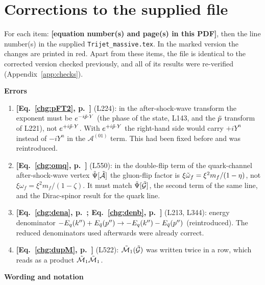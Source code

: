 \documentclass[9pt]{article}
\numberwithin{equation}{section}
\begin{document}
\appendix
\section{Corrections to the supplied file}\label{app:corr}
For each item: \textbf{[equation number(s) and page(s) in this PDF]}, then the line number(s) in the supplied \texttt{Trijet\_massive.tex}. In the marked version the changes are printed in {\color{red}red}. Apart from these items, the file is identical to the corrected version checked previously, and all of its results were re-verified (Appendix~\ref{app:checks}).

\noindent\textbf{Errors}
\begin{enumerate}
    \item \textbf{[Eq.~\eqref{chg:pFT2}, p.~\pageref{chg:pFT2}]} (L224): in the after-shock-wave transform the exponent must be $e^{-i\Tilde{p}\cdot Y}$ (the phase of the state, L143, and the $\Tilde{p}$ transform of L221), not $e^{+i\Tilde{p}\cdot Y}$. With $e^{+i\Tilde{p}\cdot Y}$ the right-hand side would carry $+iY^{n}$ instead of $-iY^{n}$ in the $\mathcal{A}^{(01)}$ term. This had been fixed before and was reintroduced.
    \item \textbf{[Eq.~\eqref{chg:omq}, p.~\pageref{chg:omq}]} (L550): in the double-flip term of the quark-channel after-shock-wave vertex $\Tilde{\Psi}[\Tilde{\mathcal{A}}]$ the gluon-flip factor is $\xi\Tilde{\omega}_{f}=\xi^{2}m_{f}/(1-\eta)$, not $\xi\omega_{f}=\xi^{2}m_{f}/(1-\zeta)$. It must match $\Tilde{\Psi}[\Tilde{\mathcal{G}}]$, the second term of the same line, and the Dirac-spinor result for the quark line.
    \item \textbf{[Eq.~\eqref{chg:dena}, p.~\pageref{chg:dena}; Eq.~\eqref{chg:denb}, p.~\pageref{chg:denb}]} (L213, L344): energy denominator $-E_{q}(k'')+E_{\Bar{q}}(p'')\rightarrow-E_{q}(k'')-E_{\Bar{q}}(p'')$ (reintroduced). The reduced denominators used afterwards were already correct.
    \item \textbf{[Eq.~\eqref{chg:dupM}, p.~\pageref{chg:dupM}]} (L522): $\Tilde{\mathcal{M}}_{1}(\Tilde{\mathcal{G}})$ was written twice in a row, which reads as a product $\Tilde{\mathcal{M}}_{1}\Tilde{\mathcal{M}}_{1}$.
\end{enumerate}
\noindent\textbf{Wording and notation}
\end{document}
